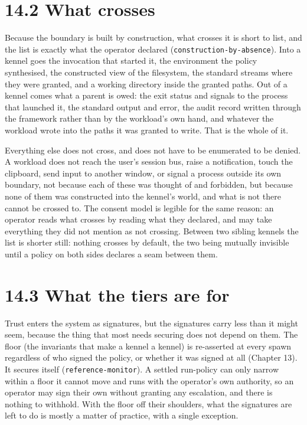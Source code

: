 \hypertarget{what-crosses}{%
\section{14.2 What crosses}\label{what-crosses}}

Because the boundary is built by construction, what crosses it is short
to list, and the list is exactly what the operator declared
(\texttt{construction-by-absence}). Into a kennel goes the invocation
that started it, the environment the policy synthesised, the constructed
view of the filesystem, the standard streams where they were granted,
and a working directory inside the granted paths. Out of a kennel comes
what a parent is owed: the exit status and signals to the process that
launched it, the standard output and error, the audit record written
through the framework rather than by the workload's own hand, and
whatever the workload wrote into the paths it was granted to write. That
is the whole of it.

Everything else does not cross, and does not have to be enumerated to be
denied. A workload does not reach the user's session bus, raise a
notification, touch the clipboard, send input to another window, or
signal a process outside its own boundary, not because each of these was
thought of and forbidden, but because none of them was constructed into
the kennel's world, and what is not there cannot be crossed to. The
consent model is legible for the same reason: an operator reads what
crosses by reading what they declared, and may take everything they did
not mention as not crossing. Between two sibling kennels the list is
shorter still: nothing crosses by default, the two being mutually
invisible until a policy on both sides declares a seam between them.

\hypertarget{what-the-tiers-are-for}{%
\section{14.3 What the tiers are for}\label{what-the-tiers-are-for}}

Trust enters the system as signatures, but the signatures carry less
than it might seem, because the thing that most needs securing does not
depend on them. The floor (the invariants that make a kennel a kennel)
is re-asserted at every spawn regardless of who signed the policy, or
whether it was signed at all (Chapter 13). It secures itself
(\texttt{reference-monitor}). A settled run-policy can only narrow
within a floor it cannot move and runs with the operator's own
authority, so an operator may sign their own without granting any
escalation, and there is nothing to withhold. With the floor off their
shoulders, what the signatures are left to do is mostly a matter of
practice, with a single exception.

